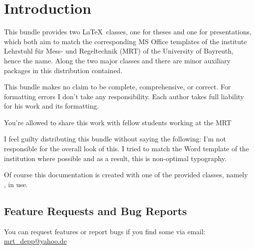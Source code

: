 \chapter{Introduction}
This bundle provides two \LaTeX\ classes, one for theses and one for
presentations, which both aim to match the corresponding MS Office templates of
the institute Lehrstuhl für Mess- und Regeltechnik (MRT) of the University of
Bayreuth, hence the name. Along the two major classes  and
 there are minor auxiliary packages in this distribution contained.

This bundle makes no claim to be complete, comprehensive, or correct. For
formatting errors I don't take any responsibility. Each author takes full
liability for his work and its formatting.

You're allowed to share this work with fellow students working at the MRT

I feel guilty distributing this bundle without saying the following: I'm not
responsible for the overall look of this. I tried to match the Word template of
the institution where possible and as a result, this is non-optimal typography.

Of course this documentation is created with one of the provided classes, namely
, in use.

\section{Feature Requests and Bug Reports}\label{sec:bugs}
You can request features or report bugs if you find some via email:
\href{mailto:mrt_depp@yahoo.de?subject=MRTbundle -- bug report}
  {mrt\_depp@yahoo.de}

